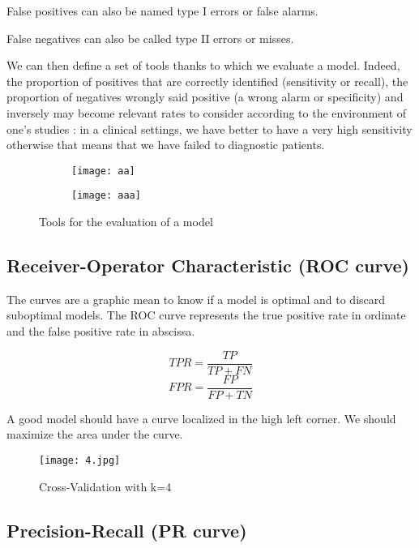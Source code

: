 \documentclass[a4paper,12pt]{article}
\begin{document}
False positives can also be named type I errors or false alarms.

False negatives can also be called type II errors or misses.

We can then define a set of tools thanks to which we evaluate a model. Indeed, the proportion of positives that are correctly identified (sensitivity or recall), the proportion of negatives wrongly said positive (a wrong alarm or specificity) and inversely may become relevant rates to consider according to the environment of one's studies : in a clinical settings, we have better to have a very high sensitivity otherwise that means that we have failed to diagnostic patients.   

\begin{figure}[!h]
	\centering
    \begin{subfigure}[b]{0.3\textwidth}
        \centering
        \texttt{[image: aa]}
    \end{subfigure}
    \begin{subfigure}[b]{0.3\textwidth}
        \centering
        \texttt{[image: aaa]}
    \end{subfigure}
    \caption{Tools for the evaluation of a model}
    \label{fig:three graphs}
\end{figure}

\subsection{Receiver-Operator Characteristic (ROC curve)}

The curves are a graphic mean to know if a model is optimal and to discard suboptimal models.
The ROC curve represents the true positive rate in ordinate and the false positive rate in abscissa.

\[TPR = \frac{TP}{TP + FN}\]
\[FPR = \frac{FP}{FP + TN}\]
      
      A good model should have a curve localized in the high left corner. We should maximize the area under the curve.
\begin{figure}[!h]
\centering
\texttt{[image: 4.jpg]}
\caption{\label{fig:1}Cross-Validation with k=4}
\end{figure}

\subsection{Precision-Recall (PR curve)}
 
\end{document}
